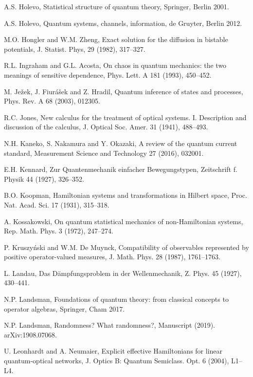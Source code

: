 \documentclass[12pt]{article}
\begin{document}
\begin{thebibliography}{99}
 A.S. Holevo,
Statistical structure of quantum theory,
Springer, Berlin 2001.

 A.S. Holevo,
Quantum systems, channels, information,
de Gruyter, Berlin 2012.

 M.O. Hongler and W.M. Zheng,
Exact solution for the diffusion in bistable potentials,
J. Statist. Phys, 29 (1982), 317--327.

 R.L. Ingraham and G.L. Acosta, 
On chaos in quantum mechanics: the two meanings of sensitive dependence,
Phys. Lett. A 181 (1993), 450--452.

 M. Je\v zek, J. Fiur\'a\v sek and Z. Hradil,
 Quantum inference of states and processes,
Phys. Rev. A 68 (2003), 012305.

 R.C. Jones,
New calculus for the treatment of optical systems. I.
Description and discussion of the calculus,
J. Optical Soc. Amer. 31 (1941), 488--493.

 N.H. Kaneko, S. Nakamura and Y. Okazaki,
A review of the quantum current standard,
Measurement Science and Technology 27 (2016), 032001.

 E.H. Kennard,
Zur Quantenmechanik einfacher Bewegungstypen,
Zeitschrift f. Physik 44 (1927), 326--352.

 B.O. Koopman,
Hamiltonian systems and transformations in Hilbert space,
Proc. Nat. Acad. Sci. 17 (1931), 315--318.

 A. Kossakowski,
On quantum statistical mechanics of non-Hamiltonian systems,
Rep. Math. Phys. 3 (1972), 247--274.

 P. Kruszy\'nski and W.M. De Muynck,
Compatibility of observables represented by positive operator-valued
measures,
J. Math. Phys. 28 (1987), 1761--1763.

 L. Landau,
Das D\"ampfungsproblem in der Wellenmechanik,
Z. Phys. 45 (1927), 430--441.

 N.P. Landsman,
Foundations of quantum theory: from classical concepts to operator 
algebras,
Springer, Cham 2017.

 N.P. Landsman,
Randomness? What randomness?,
Manuscript (2019).\\
arXiv:1908.07068.

 U. Leonhardt and A. Neumaier,
Explicit effective Hamiltonians for linear quantum-optical networks,
J. Optics B: Quantum Semiclass. Opt. 6 (2004), L1--L4.


\end{thebibliography}
\end{document}
